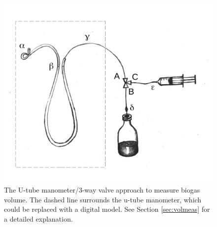 \documentclass[]{article}
\begin{document}
\begin{figure}
  \includegraphics[]{figs/GD_utube.pdf}
  \caption{The U-tube manometer/3-way valve approach to measure biogas volume. The dashed line surrounds the u-tube manometer, which could be replaced with a digital model. See Section \ref{sec:volmeas} for a detailed explanation.} 
  \label{fig:utube}
\end{figure}
\end{document}
